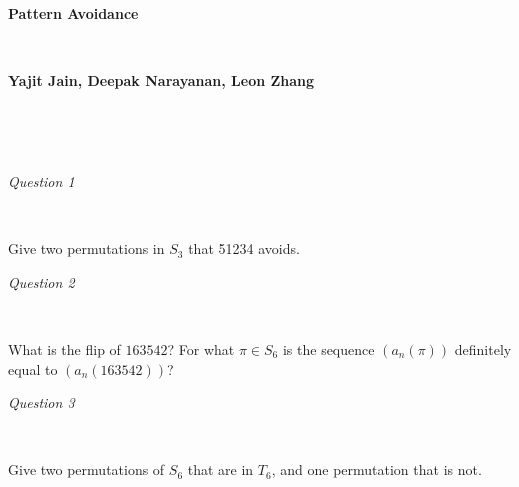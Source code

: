 \documentclass[12pt]{article}
\begin{document}
\begin{center}
{\bf\Large {Pattern Avoidance}}
\

\

{\bf \large {Yajit Jain, Deepak Narayanan, Leon Zhang}}
\end{center}


\

\


\emph{Question 1}

\


Give two permutations in $S_3$ that 51234 avoids. 

\vspace{4cm}


\emph{Question 2}

\
 
What is the flip of $163542$? For what $\pi \in S_6$ is the sequence $(a_n(\pi))$ definitely equal to $(a_n(163542))$?

\vspace{4cm}



\emph{Question 3}

\

Give two permutations of $S_6$ that are in $T_6$, and one permutation that is not.
\end{document}
